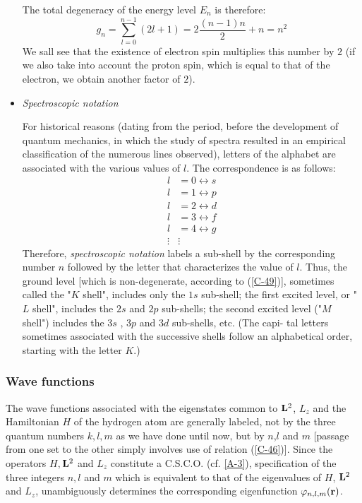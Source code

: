 \begin{itemize}
The total degeneracy of the energy level $E_n$ is therefore:
\begin{equation}\label{C-49}
	g_n=\sum_{l=0}^{n-1}(2l+1)=2\frac{(n-1)n}{2}+n=n^2
\end{equation}
We sall see that the existence of electron spin multiplies this number by $2$ (if we also take into account the proton spin, which is equal to that of the electron, we obtain another factor of $2$).

\item \textit{Spectroscopic notation}

For historical reasons (dating from the period, before the development of quantum mechanics, in which the study of spectra resulted in an empirical classification of the numerous lines observed), letters of the alphabet are associated with the various values of $l$. The correspondence is as follows:
\begin{align*}
	l&=0\leftrightarrow s\\
	l&=1\leftrightarrow p\\
	l&=2\leftrightarrow d\\
	l&=3\leftrightarrow f\\
	l&=4\leftrightarrow g\\
	\vdots & \vdots
\end{align*}
Therefore, \textit{spectroscopic notation} labels a sub-shell by the corresponding number $n$ followed by the letter that characterizes the value of $l$. Thus, the ground level [which is non-degenerate, according to (\ref{C-49})], sometimes called the "$K$ shell", includes only the $1s$ sub-shell; the first excited level, or "$L$ shell", includes the $2s$ and $2p$ sub-shells; the second excited level ("$M$ shell") includes the $3s$ , $3p$ and $3d$ sub-shells, etc. (The capi- tal letters sometimes associated with the successive shells follow an alphabetical order, starting with the letter $K$.)
\end{itemize}

\subsubsection{Wave functions}\label{sec:C-4-c}
The wave functions associated with the eigenstates common to $\vb{L}^2$, $L_z$ and the Hamiltonian $H$ of the hydrogen atom are generally labeled, not by the three quantum numbers $k,l,m$ as we have done until now, but by $n$,$l$ and $m$ [passage from one set to the other simply involves use of relation (\ref{C-46})]. Since the operators $H, $$\vb{L}^2$ and $L_z$ constitute a C.S.C.O. (cf. \ref{A-3}), specification of the three integers $n,l$ and $m$ which is equivalent to that of the eigenvalues of $H$, $\vb{L}^2$ and $L_z$, unambiguously determines the corresponding eigenfunction $\varphi_{n,l,m}(\vb{r})$.

